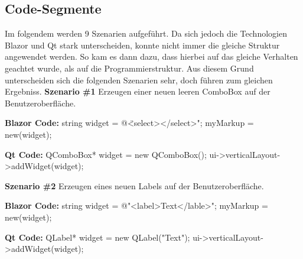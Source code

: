 \subsection{Code-Segmente}
\label{subsec:CodeSegemente}
Im folgendem werden 9 Szenarien aufgeführt. Da sich jedoch die Technologien Blazor und Qt stark
unterscheiden, konnte nicht immer die gleiche Struktur angewendet werden. So kam es dann dazu,
dass hierbei auf das gleiche Verhalten geachtet wurde, als auf die Programmierstruktur. Aus
diesem Grund unterscheiden sich die folgenden Szenarien sehr, doch führen zum gleichen Ergebniss.
\newline
\newline
\textbf{Szenario \#1}
\newline
Erzeugen einer neuen leeren ComboBox auf der Benutzeroberfläche.

\begin{zitat}
    \textbf{Blazor Code:}
    \newline
    string widget = @\" <select></select>";
    \newline
    myMarkup = new(widget);
\end{zitat}

\begin{zitat}
    \textbf{Qt Code:}
    \newline
    QComboBox* widget = new QComboBox();
    \newline
    ui->verticalLayout->addWidget(widget);
\end{zitat}
\newline
\newline

\textbf{Szenario \#2}
\newline
Erzeugen eines neuen Labels auf der Benutzeroberfläche.

\begin{zitat}
    \textbf{Blazor Code:}
    \newline
    string widget = @"<label>Text</lable>";
    \newline
    myMarkup = new(widget);
\end{zitat}

\begin{zitat}
    \textbf{Qt Code:}
    \newline
    QLabel* widget = new QLabel("Text");
    \newline
    ui->verticalLayout->addWidget(widget);
\end{zitat}
\newline
\newline

